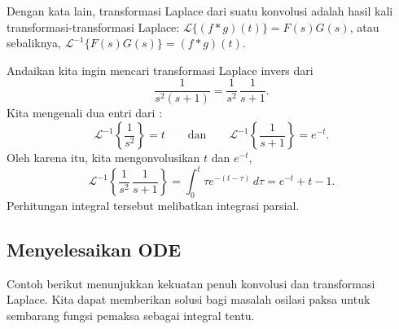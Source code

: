 Dengan kata lain, transformasi Laplace dari suatu konvolusi adalah hasil kali
transformasi-transformasi Laplace:
${\mathcal{L}} \bigl\{ (f*g)(t) \bigr\} = F(s)G(s)$,
atau sebaliknya,
${\mathcal{L}}^{-1} \bigl\{ F(s) G(s) \bigr\} = (f*g)(t)$.

\begin{example}
Andaikan kita ingin mencari transformasi Laplace invers dari
\begin{equation*}
\frac{1}{s^2(s+1)} = 
\frac{1}{s^2}
\,
\frac{1}{s+1}
.
\end{equation*}
Kita mengenali dua entri dari :
\begin{equation*}
\mathcal{L}^{-1} 
\left\{
\frac{1}{s^2} \right\} 
= t
\qquad \text{dan} \qquad
\mathcal{L}^{-1} 
\left\{
\frac{1}{s+1} \right\}
= e^{-t}
.
\end{equation*}
Oleh karena itu, kita mengonvolusikan $t$ dan $e^{-t}$,
\begin{equation*}
\mathcal{L}^{-1}
\left\{
\frac{1}{s^2}
\,
\frac{1}{s+1}
\right\}
=
\int_0^t
\tau e^{-(t-\tau)} \,d\tau
=
e^{-t}+t-1 .
\end{equation*}
Perhitungan integral tersebut melibatkan integrasi parsial.
\end{example}

\subsection{Menyelesaikan ODE}

Contoh berikut menunjukkan kekuatan penuh konvolusi dan
transformasi Laplace.  Kita dapat memberikan solusi bagi
masalah osilasi paksa untuk sembarang fungsi pemaksa sebagai integral
tentu.

